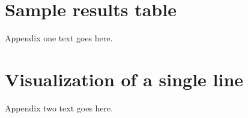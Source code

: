 \documentclass[12pt,journal,compsoc]{IEEEtran}
\begin{document}

%


\appendices
\section{Sample results table}
Appendix one text goes here.

\section{Visualization of a single line}
Appendix two text goes here.





\ifCLASSOPTIONcaptionsoff
  \newpage
\fi



\end{document}
